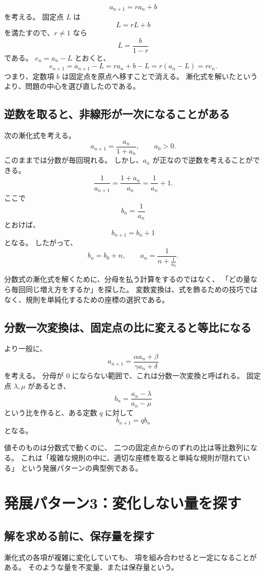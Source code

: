 \[
  a_{n+1}=ra_n+b
\]
を考える。
固定点 $L$ は
\[
  L=rL+b
\]
を満たすので、$r\neq1$ なら
\[
  L=\frac{b}{1-r}
\]
である。
$e_n=a_n-L$ とおくと、
\[
  e_{n+1}
  =a_{n+1}-L
  =ra_n+b-L
  =r(a_n-L)
  =re_n.
\]
つまり、定数項 $b$ は固定点を原点へ移すことで消える。
漸化式を解いたというより、問題の中心を選び直したのである。

\subsection{逆数を取ると、非線形が一次になることがある}

次の漸化式を考える。
\[
  a_{n+1}=\frac{a_n}{1+a_n},
  \qquad a_0>0.
\]
このままでは分数が毎回現れる。
しかし、$a_n$ が正なので逆数を考えることができる。
\[
  \frac1{a_{n+1}}
  =\frac{1+a_n}{a_n}
  =\frac1{a_n}+1.
\]
ここで
\[
  b_n=\frac1{a_n}
\]
とおけば、
\[
  b_{n+1}=b_n+1
\]
となる。
したがって、
\[
  b_n=b_0+n,\qquad
  a_n=\frac1{n+\frac1{a_0}}.
\]

分数式の漸化式を解くために、分母を払う計算をするのではなく、
「どの量なら毎回同じ増え方をするか」を探した。
変数変換は、式を飾るための技巧ではなく、規則を単純化するための座標の選択である。

\subsection{分数一次変換は、固定点の比に変えると等比になる}

より一般に、
\[
  a_{n+1}=\frac{\alpha a_n+\beta}{\gamma a_n+\delta}
\]
を考える。
分母が $0$ にならない範囲で、これは分数一次変換と呼ばれる。
固定点 $\lambda,\mu$ があるとき、
\[
  b_n=\frac{a_n-\lambda}{a_n-\mu}
\]
という比を作ると、ある定数 $q$ に対して
\[
  b_{n+1}=q b_n
\]
となる。

値そのものは分数式で動くのに、
二つの固定点からのずれの比は等比数列になる。
これは「複雑な規則の中に、適切な座標を取ると単純な規則が隠れている」
という発展パターンの典型例である。

\section{発展パターン3：変化しない量を探す}

\subsection{解を求める前に、保存量を探す}

漸化式の各項が複雑に変化していても、
項を組み合わせると一定になることがある。
そのような量を不変量、または保存量という。

